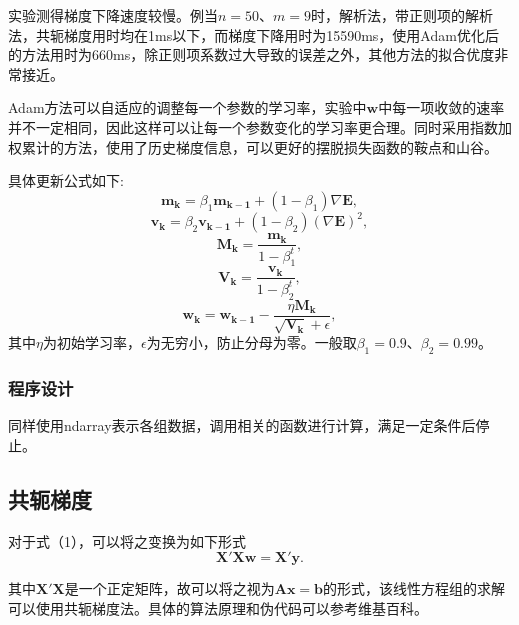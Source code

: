 \documentclass[withoutpreface,bwprint]{cumcmthesis}
\begin{document}
实验测得梯度下降速度较慢。例当$n=50$、$m=9$时，解析法，带正则项的解析法，共轭梯度用时均在1ms以下，而梯度下降用时为15590ms，使用Adam优化后的方法用时为660ms，除正则项系数过大导致的误差之外，其他方法的拟合优度非常接近。

Adam方法可以自适应的调整每一个参数的学习率，实验中$\boldsymbol{w}$中每一项收敛的速率并不一定相同，因此这样可以让每一个参数变化的学习率更合理。同时采用指数加权累计的方法，使用了历史梯度信息，可以更好的摆脱损失函数的鞍点和山谷。

具体更新公式如下:
\begin{equation*}
\boldsymbol{m_{k}}=\beta_{1}\boldsymbol{m_{k-1}}+\left(1-\beta_{1}\right)\nabla\boldsymbol{E},
\end{equation*}
\begin{equation*}
\boldsymbol{v_{k}}=\beta_{2}\boldsymbol{v_{k-1}}+\left(1-\beta_{2}\right)\left(\nabla\boldsymbol{E}\right)^{2},
\end{equation*}
\begin{equation*}
\boldsymbol{M_{k}}=\frac{\boldsymbol{m_{k}}}{1-\beta_{1}^{t}},
\end{equation*}
\begin{equation*}
\boldsymbol{V_{k}}=\frac{\boldsymbol{v_{k}}}{1-\beta_{2}^{t}},
\end{equation*}
\begin{equation*}
\boldsymbol{w_{k}}=\boldsymbol{w_{k-1}}-\frac{\eta \boldsymbol{M_{k}}}{\sqrt{\boldsymbol{V_{k}}}+\epsilon},
\end{equation*}
其中$\eta$为初始学习率，$\epsilon$为无穷小，防止分母为零。一般取$\beta_{1}=0.9$、$\beta_{2}=0.99$。

\subsubsection{程序设计}
同样使用ndarray表示各组数据，调用相关的函数进行计算，满足一定条件后停止。

\subsection{共轭梯度}
对于式（1），可以将之变换为如下形式
\begin{equation*}
\boldsymbol{{X}'Xw}=\boldsymbol{{X}'y}.
\end{equation*}

其中$\boldsymbol{{X}'X}$是一个正定矩阵，故可以将之视为$\boldsymbol{Ax}=\boldsymbol{b}$的形式，该线性方程组的求解可以使用共轭梯度法。具体的算法原理和伪代码可以参考维基百科\cite{wiki}。
\end{document}
